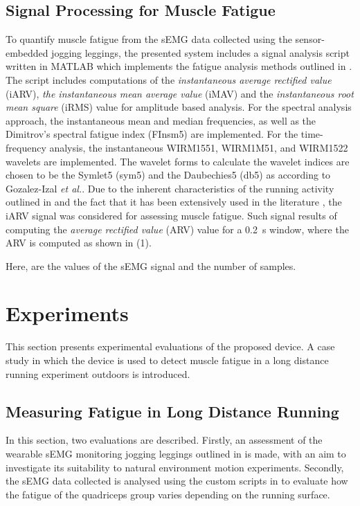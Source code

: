 \documentclass[letterpaper, 10 pt, conference]{ieeeconf}
\begin{document}
\subsection{Signal Processing for Muscle Fatigue}\label{ss:sig_proc}
To quantify muscle fatigue from the sEMG data collected using the
sensor-embedded jogging leggings, the presented system includes a signal
analysis script written in MATLAB which implements the fatigue analysis methods
outlined in . The script includes computations of the
\emph{instantaneous average rectified value} (iARV), \emph{the instantaneous mean average
value} (iMAV) and the \emph{instantaneous root mean square} (iRMS) value for
amplitude based analysis. For the spectral analysis approach, the instantaneous
mean and median frequencies, as well as the Dimitrov's spectral fatigue index
(FInsm5) \cite{dimitrov2006muscle} are implemented. For the time-frequency
analysis, the instantaneous WIRM1551, WIRM1M51, and WIRM1522 wavelets are
implemented. The wavelet forms to calculate the wavelet indices are chosen to
be the Symlet5 (sym5) and the Daubechies5 (db5) as according to Gozalez-Izal
\emph{et al.}\cite{gonzalez2010linear}. Due to the inherent characteristics of the running activity outlined in  and the fact that it has been extensively used in the literature \cite{gonzalez2012electromyographic}, the iARV signal was considered for assessing muscle fatigue. Such signal results of computing the \emph{average rectified value} (ARV) value for a \SI{0,2}{\second} window, where the ARV is computed as shown in (1).



Here,  are the values of the sEMG signal and  the number of samples.

\section{Experiments}\label{s:experiments}
This section presents experimental evaluations of the proposed device. A case study in which the device is used to detect muscle fatigue
in a long distance running experiment outdoors is introduced.







\subsection{Measuring Fatigue in Long Distance Running}\label{ss:fatigueexpt}
In this section, two evaluations are described. Firstly, an assessment of the
wearable sEMG monitoring jogging leggings outlined in   is
made, with an aim to investigate its suitability to natural environment motion
experiments. Secondly, the sEMG data collected is analysed using the custom
scripts in  to evaluate how the fatigue of the quadriceps
group varies depending on the running surface.
\end{document}
